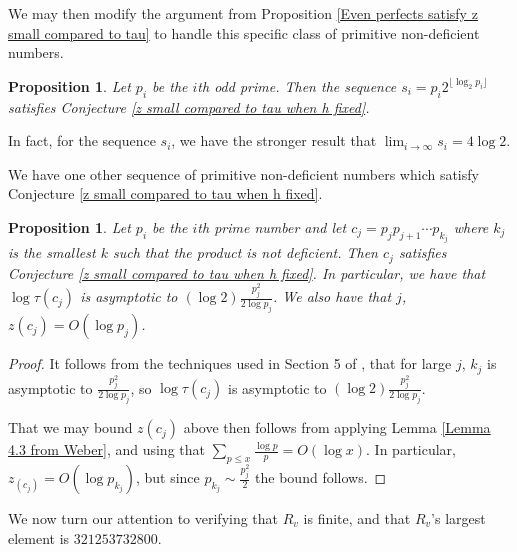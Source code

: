 \documentclass{article}
\newtheorem{proposition}[theorem]{Proposition}
\begin{document}
We may then modify the argument from Proposition \ref{Even perfects satisfy z small compared to tau} to handle this specific class of primitive non-deficient numbers.

\begin{proposition} Let $p_i$ be the $i$th odd prime. Then the sequence $s_i =p_i2^{\lfloor \log_2 p_i \rfloor} $ satisfies Conjecture \ref{z small compared to tau when h fixed}.
\end{proposition}

In fact, for the sequence $s_i$, we have the stronger result that $\lim_{i \rightarrow \infty} s_i = 4 \log 2$.

We have one other sequence of primitive non-deficient numbers which satisfy Conjecture \ref{z small compared to tau when h fixed}. 

\begin{proposition} Let $p_i$ be the $i$th prime number and let $ c_j=p_jp_{j+1}\cdots p_{k_j}$ where $k_j$ is the smallest $k$ such that the product is not deficient. Then $c_j$ satisfies Conjecture \ref{z small compared to tau when h fixed}. In particular, we have that $\log \tau(c_j)$ is asymptotic to $(\log 2)\frac{p_j^2}{2 \log p_j}$. We also have that
$j$, $z(c_j)=O(\log p_j)$.\label{aj has z not much more than log pj}
\end{proposition}
\begin{proof} It follows from the techniques used in Section 5 of \cite{Zelinskybig}, that for large $j$, $k_j$ is asymptotic to $\frac{p_j^2}{2 \log p_j}$, so $\log \tau(c_j)$ is asymptotic to $(\log 2)\frac{p_j^2}{2 \log p_j}$.

That we may bound $z(c_j)$ above then follows from applying Lemma \ref{Lemma 4.3 from Weber}, and using that $\sum_{p \leq x}\frac{\log p}{p} = O(\log x)$.  In particular, $z_(c_j) = O(\log p_{k_j})$, but since $p_{k_j} \sim \frac{p_j^2}{2}$ the bound follows.  
\end{proof}

We now turn our attention to verifying that $R_v$ is finite, and that $R_v$'s largest element is $321253732800$. 
\end{document}
